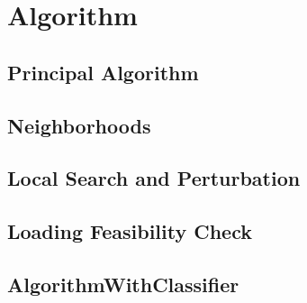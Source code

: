 \chapter{Algorithm}
\label{chap:algorithm}

\section{Principal Algorithm}
\label{sec:algorithm}



\section{Neighborhoods}
\label{sec:neighborhoods}

\section{Local Search and Perturbation}
\label{sec:LSandPerturbation}




\section{Loading Feasibility Check}
\label{sec:FeasibilityCheck}




\section{AlgorithmWithClassifier}
\label{sec:AlgorithmWithClassifier}
